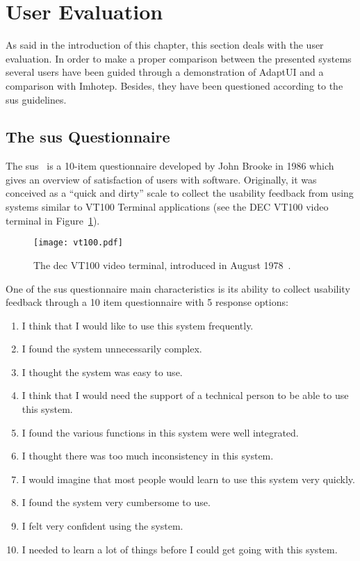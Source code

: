 \section{User Evaluation}
\label{sec:user_evaluation}

As said in the introduction of this chapter, this section deals with the user 
evaluation. In order to make a proper comparison between the presented systems 
several users have been guided through a demonstration of AdaptUI and a 
comparison with Imhotep. Besides, they have been questioned according to the 
\ac{sus} guidelines.

\subsection{The \ac{sus} Questionnaire}
\label{sec:sus}
The \ac{sus}~\citep{sus} is a 10-item questionnaire 
developed by John Brooke in 1986 which gives an overview of satisfaction of 
users with software. Originally, it was conceived as a ``quick and dirty'' 
scale to collect the usability feedback from using systems similar to VT100 
Terminal applications (see the DEC VT100 video terminal in 
Figure~\ref{fig:vt100}).

\begin{figure}
\centering
\texttt{[image: vt100.pdf]}
\caption{The \ac{dec} VT100 video terminal, introduced in August 1978~\citep{vt100}.}
\label{fig:vt100}
\end{figure}

One of the \ac{sus} questionnaire main characteristics is its ability to collect
usability feedback through a 10 item questionnaire with 5 response options: 

\begin{enumerate}
 \item I think that I would like to use this system frequently.
 \item I found the system unnecessarily complex.
 \item I thought the system was easy to use.
 \item I think that I would need the support of a technical person to be able to
 use this system.
 \item I found the various functions in this system were well integrated.
 \item I thought there was too much inconsistency in this system.
 \item I would imagine that most people would learn to use this system very
 quickly.
 \item I found the system very cumbersome to use.
 \item I felt very confident using the system.
 \item I needed to learn a lot of things before I could get going with this
 system.
\end{enumerate}

